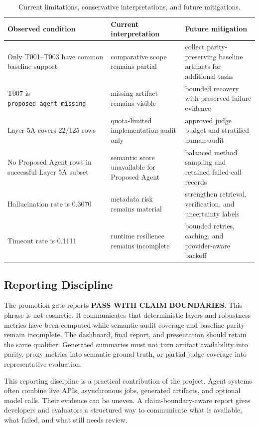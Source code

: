 \documentclass[10pt,twocolumn]{article}
\begin{document}
\begin{table}[t]
\centering
\footnotesize
\begin{tabularx}{\textwidth}{l X X}
\toprule
Observed condition & Current interpretation & Future mitigation \\
\midrule
Only T001--T003 have common baseline support & comparative scope remains partial & collect parity-preserving baseline artifacts for additional tasks \\
T007 is \texttt{proposed\_agent\_missing} & missing artifact remains visible & bounded recovery with preserved failure evidence \\
Layer 5A covers 22/125 rows & quota-limited implementation audit only & approved judge budget and stratified human audit \\
No Proposed Agent rows in successful Layer 5A subset & semantic score unavailable for Proposed Agent & balanced method sampling and retained failed-call records \\
Hallucination rate is 0.3070 & metadata risk remains material & strengthen retrieval, verification, and uncertainty labels \\
Timeout rate is 0.1111 & runtime resilience remains incomplete & bounded retries, caching, and provider-aware backoff \\
\bottomrule
\end{tabularx}
\caption{Current limitations, conservative interpretations, and future mitigations.}
\label{tab:mitigation}
\end{table}

\subsection{Reporting Discipline}
The promotion gate reports \textbf{PASS WITH CLAIM BOUNDARIES}. This phrase is not cosmetic. It communicates that deterministic layers and robustness metrics have been computed while semantic-audit coverage and baseline parity remain incomplete. The dashboard, final report, and presentation should retain the same qualifier. Generated summaries must not turn artifact availability into parity, proxy metrics into semantic ground truth, or partial judge coverage into representative evaluation.

This reporting discipline is a practical contribution of the project. Agent systems often combine live APIs, asynchronous jobs, generated artifacts, and optional model calls. Their evidence can be uneven. A claim-boundary-aware report gives developers and evaluators a structured way to communicate what is available, what failed, and what still needs review.
\end{document}
